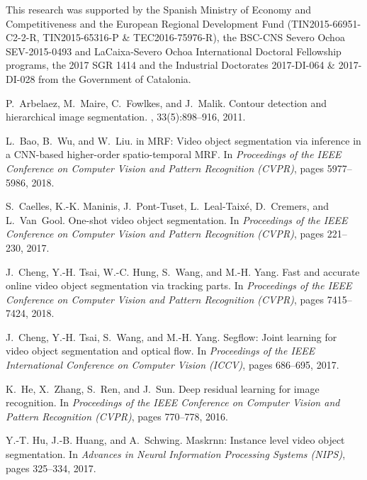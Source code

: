\documentclass[10pt,twocolumn,letterpaper]{article}
\begin{document}
This research was supported by the Spanish Ministry of Economy and Competitiveness and the European Regional Development Fund (TIN2015-66951-C2-2-R, TIN2015-65316-P \& TEC2016-75976-R), the BSC-CNS Severo Ochoa SEV-2015-0493 and LaCaixa-Severo Ochoa International Doctoral Fellowship programs, the 2017 SGR 1414 and the Industrial Doctorates 2017-DI-064 \& 2017-DI-028 from the Government of Catalonia. \begin{thebibliography}{10}\itemsep=-1pt

P.~Arbelaez, M.~Maire, C.~Fowlkes, and J.~Malik.
\newblock Contour detection and hierarchical image segmentation.
,
  33(5):898--916, 2011.

L.~Bao, B.~Wu, and W.~Liu.
 in {MRF}: {V}ideo object segmentation via inference in a
  {CNN}-based higher-order spatio-temporal {MRF}.
\newblock In {\em Proceedings of the IEEE Conference on Computer Vision and
  Pattern Recognition (CVPR)}, pages 5977--5986, 2018.

S.~Caelles, K.-K. Maninis, J.~Pont-Tuset, L.~Leal-Taix{\'e}, D.~Cremers, and
  L.~Van~Gool.
\newblock One-shot video object segmentation.
\newblock In {\em Proceedings of the IEEE Conference on Computer Vision and
  Pattern Recognition (CVPR)}, pages 221--230, 2017.

J.~Cheng, Y.-H. Tsai, W.-C. Hung, S.~Wang, and M.-H. Yang.
\newblock Fast and accurate online video object segmentation via tracking
  parts.
\newblock In {\em Proceedings of the IEEE Conference on Computer Vision and
  Pattern Recognition (CVPR)}, pages 7415--7424, 2018.

J.~Cheng, Y.-H. Tsai, S.~Wang, and M.-H. Yang.
\newblock Segflow: Joint learning for video object segmentation and optical
  flow.
\newblock In {\em Proceedings of the IEEE International Conference on Computer
  Vision (ICCV)}, pages 686--695, 2017.

K.~He, X.~Zhang, S.~Ren, and J.~Sun.
\newblock Deep residual learning for image recognition.
\newblock In {\em Proceedings of the IEEE Conference on Computer Vision and
  Pattern Recognition (CVPR)}, pages 770--778, 2016.

Y.-T. Hu, J.-B. Huang, and A.~Schwing.
\newblock Maskrnn: Instance level video object segmentation.
\newblock In {\em Advances in Neural Information Processing Systems (NIPS)},
  pages 325--334, 2017.


\end{thebibliography}
\end{document}
